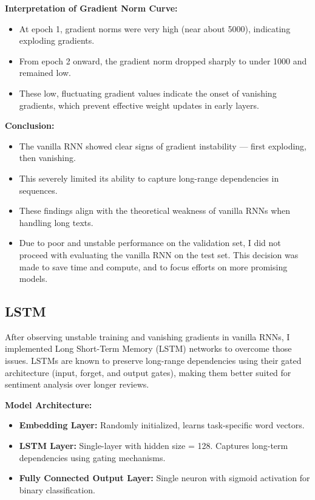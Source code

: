 \documentclass[12pt]{article}
\begin{document}
\textbf{Interpretation of Gradient Norm Curve:}
\begin{itemize}
    \item At epoch 1, gradient norms were very high (near about 5000), indicating exploding gradients.
    \item From epoch 2 onward, the gradient norm dropped sharply to under 1000 and remained low.
    \item These low, fluctuating gradient values indicate the onset of vanishing gradients, which prevent effective weight updates in early layers.
\end{itemize}

\textbf{Conclusion:}
\begin{itemize}
    \item The vanilla RNN showed clear signs of gradient instability — first exploding, then vanishing.
    \item This severely limited its ability to capture long-range dependencies in sequences.
    \item These findings align with the theoretical weakness of vanilla RNNs when handling long texts.
    \item Due to poor and unstable performance on the validation set, I did not proceed with evaluating the vanilla RNN on the test set. This decision was made to save time and compute, and to focus efforts on more promising models.

\end{itemize}

\subsection{LSTM}
After observing unstable training and vanishing gradients in vanilla RNNs, I implemented Long Short-Term Memory (LSTM) networks to overcome those issues. LSTMs are known to preserve long-range dependencies using their gated architecture (input, forget, and output gates), making them better suited for sentiment analysis over longer reviews.

\textbf{Model Architecture:}
\begin{itemize}
    \item \textbf{Embedding Layer:} Randomly initialized, learns task-specific word vectors.
    \item \textbf{LSTM Layer:} Single-layer with hidden size = 128. Captures long-term dependencies using gating mechanisms.
    \item \textbf{Fully Connected Output Layer:} Single neuron with sigmoid activation for binary classification.
\end{itemize}
\end{document}
